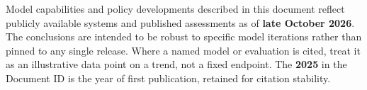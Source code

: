 \documentclass[11pt,letterpaper]{article}
\begin{document}
\begin{infobox}
Model capabilities and policy developments described in this document reflect publicly available systems and published assessments as of \textbf{late October 2026}. The conclusions are intended to be robust to specific model iterations rather than pinned to any single release. Where a named model or evaluation is cited, treat it as an illustrative data point on a trend, not a fixed endpoint. The \textbf{2025} in the Document ID is the year of first publication, retained for citation stability.
\end{infobox}

\vspace{0.15cm}

\clearpage
\begingroup
{}
\setlength{\parskip}{0pt}
\tableofcontents
\endgroup
\end{document}

